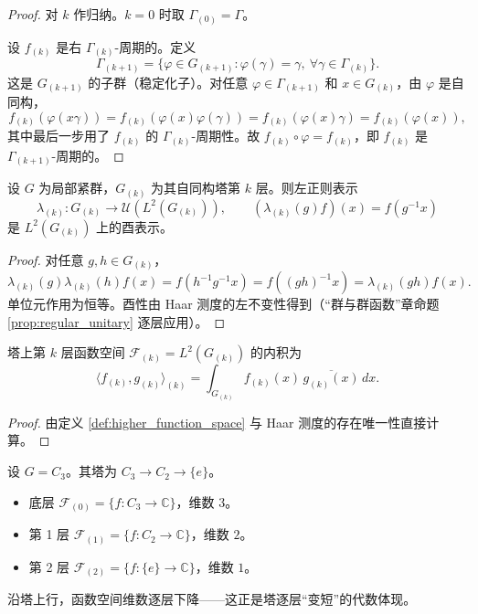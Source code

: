 \begin{proof}
对 $k$ 作归纳。$k=0$ 时取 $\Gamma_{(0)}=\Gamma$。

设 $f_{(k)}$ 是右 $\Gamma_{(k)}$-周期的。定义
\[
\Gamma_{(k+1)} = \{\varphi\in G_{(k+1)} : \varphi(\gamma)=\gamma,\ \forall\gamma\in\Gamma_{(k)}\}.
\]
这是 $G_{(k+1)}$ 的子群（稳定化子）。对任意 $\varphi\in\Gamma_{(k+1)}$ 和 $x\in G_{(k)}$，由 $\varphi$ 是自同构，
\[
f_{(k)}(\varphi(x\gamma)) = f_{(k)}(\varphi(x)\varphi(\gamma)) = f_{(k)}(\varphi(x)\gamma) = f_{(k)}(\varphi(x)),
\]
其中最后一步用了 $f_{(k)}$ 的 $\Gamma_{(k)}$-周期性。故 $f_{(k)}\circ\varphi = f_{(k)}$，即 $f_{(k)}$ 是 $\Gamma_{(k+1)}$-周期的。
\end{proof}

\begin{proposition}[塔上函数空间的正则表示结构]\label{prop:higher_function_regular_rep}
设 $G$ 为局部紧群，$G_{(k)}$ 为其自同构塔第 $k$ 层。则左正则表示
\[
\lambda_{(k)}: G_{(k)} \to \mathcal{U}(L^2(G_{(k)})),\qquad (\lambda_{(k)}(g)f)(x) = f(g^{-1}x)
\]
是 $L^2(G_{(k)})$ 上的酉表示。
\end{proposition}

\begin{proof}
对任意 $g,h\in G_{(k)}$，
\[
\lambda_{(k)}(g)\lambda_{(k)}(h)f(x) = f(h^{-1}g^{-1}x) = f((gh)^{-1}x) = \lambda_{(k)}(gh)f(x).
\]
单位元作用为恒等。酉性由 Haar 测度的左不变性得到（“群与群函数”章命题 \ref{prop:regular_unitary} 逐层应用）。
\end{proof}

\begin{corollary}[塔上函数空间的内积形式]\label{cor:higher_function_inner_product}
塔上第 $k$ 层函数空间 $\mathcal{F}_{(k)} = L^2(G_{(k)})$ 的内积为
\[
\langle f_{(k)}, g_{(k)}\rangle_{(k)} = \int_{G_{(k)}} f_{(k)}(x)\,\overline{g_{(k)}(x)}\,dx.
\]
\end{corollary}

\begin{proof}
由定义 \ref{def:higher_function_space} 与 Haar 测度的存在唯一性直接计算。
\end{proof}

\begin{example}[$C_3$ 的塔上函数空间]\label{ex:c3_tower_functions}
设 $G=C_3$。其塔为 $C_3\to C_2\to\{e\}$。
\begin{itemize}
    \item 底层 $\mathcal{F}_{(0)} = \{f: C_3\to\mathbb{C}\}$，维数 $3$。
    \item 第 1 层 $\mathcal{F}_{(1)} = \{f: C_2\to\mathbb{C}\}$，维数 $2$。
    \item 第 2 层 $\mathcal{F}_{(2)} = \{f: \{e\}\to\mathbb{C}\}$，维数 $1$。
\end{itemize}
沿塔上行，函数空间维数逐层下降——这正是塔逐层“变短”的代数体现。
\end{example}


